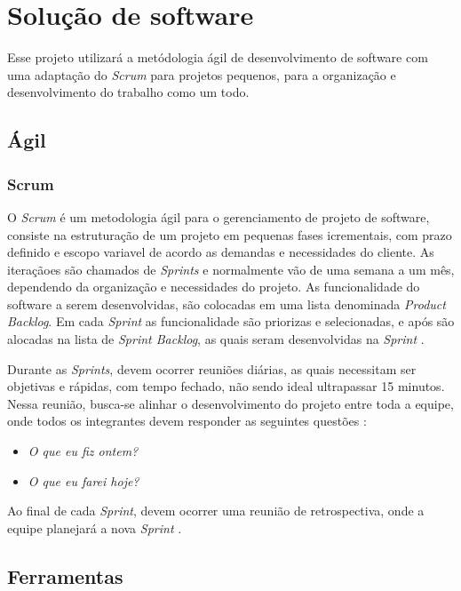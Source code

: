 \chapter[Solução de software]{Solução de software}
Esse projeto utilizará a metódologia ágil de desenvolvimento de software com uma adaptação do \textit{Scrum} para projetos pequenos, para a organização e desenvolvimento do trabalho como um todo.

\section{Ágil}
\subsection{Scrum}
O \textit{Scrum} é um metodologia ágil para o gerenciamento de projeto de software, consiste na estruturação de um projeto em pequenas fases icrementais, com prazo definido e escopo variavel de acordo as demandas e necessidades do cliente. As iteraçãoes são chamados de \textit{Sprints} e normalmente vão de uma semana a um mês, dependendo da organização e necessidades do projeto. As funcionalidade do software a serem desenvolvidas, são colocadas em uma lista denominada \textit{Product Backlog}. Em cada \textit{Sprint} as funcionalidade são priorizas e selecionadas, e após são alocadas na lista de \textit{Sprint Backlog}, as quais seram desenvolvidas na \textit{Sprint} \cite{sutherland2016scrum}.

Durante as \textit{Sprints}, devem ocorrer reuniões diárias, as quais necessitam ser objetivas e rápidas, com tempo fechado, não sendo ideal ultrapassar 15 minutos. Nessa reunião, busca-se alinhar o desenvolvimento do projeto entre toda a equipe, onde todos os integrantes devem responder as seguintes questões \cite{sutherland2016scrum}:
\begin{itemize}
    \item \textit{O que eu fiz ontem?}
    \item \textit{O que eu farei hoje?}
\end{itemize}

Ao final de cada \textit{Sprint}, devem ocorrer uma reunião de retrospectiva, onde a equipe planejará a nova \textit{Sprint} \cite{sutherland2016scrum}.

\section{Ferramentas}

